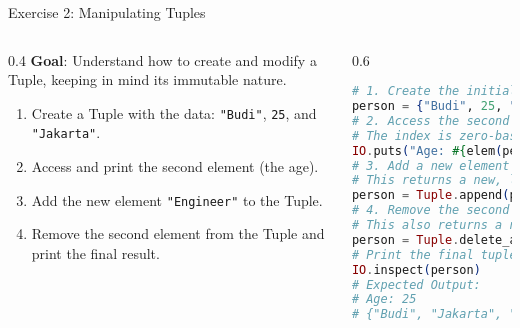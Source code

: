 \documentclass[aspectratio=169, table]{beamer}
\begin{document}
\begin{frame}[fragile]{Exercise 2: Manipulating Tuples}
\vspace{20pt}
\begin{columns}
    \begin{column}[T]{0.4\textwidth}
        \textbf{Goal}: Understand how to create and modify a Tuple, keeping in mind its immutable nature.

        \begin{enumerate}
            \item Create a Tuple with the data: \texttt{"Budi"}, \texttt{25}, and \texttt{"Jakarta"}.
            \item Access and print the second element (the age).
            \item Add the new element \texttt{"Engineer"} to the Tuple.
            \item Remove the second element from the Tuple and print the final result.
        \end{enumerate}

    \end{column}

    \begin{column}[T]{0.6\textwidth}
        \begin{lstlisting}[language=Elixir, basicstyle=\ttfamily\footnotesize]
# 1. Create the initial Tuple
person = {"Budi", 25, "Jakarta"}
# 2. Access the second element
# The index is zero-based
IO.puts("Age: #{elem(person, 1)}")
# 3. Add a new element
# This returns a new, larger tuple
person = Tuple.append(person, "Engineer")
# 4. Remove the second element
# This also returns a new, smaller tuple
person = Tuple.delete_at(person, 1)
# Print the final tuple
IO.inspect(person)
# Expected Output:
# Age: 25
# {"Budi", "Jakarta", "Engineer"}
        \end{lstlisting}
    \end{column} %
\end{columns}
\end{frame}
\end{document}

